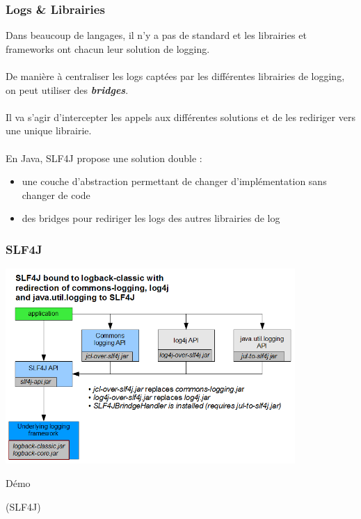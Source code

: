 \begin{frame}[fragile]
	\frametitle{Logs \& Librairies}

    Dans beaucoup de langages, il n'y a pas de standard et les librairies et frameworks ont chacun leur solution de logging.
    \\~\\
    De mani\`{e}re \`{a} centraliser les logs capt\'{e}es par les diff\'{e}rentes librairies de logging, on peut utiliser des \textbf{\textit{bridges}}.
    \\~\\
    Il va s'agir d'intercepter les appels aux diff\'{e}rentes solutions et de les rediriger vers une unique librairie.
    \\~\\
    En Java, SLF4J propose une solution double :
    \begin{itemize}
    	\item une couche d'abstraction permettant de changer d'impl\'{e}mentation sans changer de code
        \item des bridges pour rediriger les logs des autres librairies de log
    \end{itemize}  
\end{frame}

\begin{frame}
	\frametitle{SLF4J}

    \centerline{\includegraphics[width=11cm]{img/slf4j.png}}
\end{frame}

\begin{frame}
    \begin{center}
    \fontsize{48pt}{7.2}\selectfont
    D\'{e}mo
    \end{center}
    \begin{center}
    (SLF4J)
    \end{center}
\end{frame}
